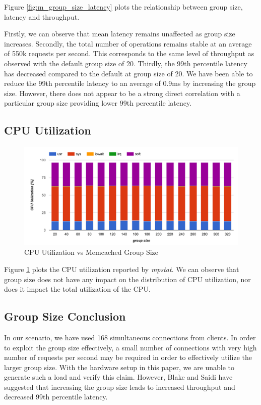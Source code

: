 Figure \ref{fig:m_group_size_latency} plots the relationship between group size, latency and throughput.

Firstly, we can observe that mean latency remains unaffected as group size increases.
Secondly, the total number of operations remains stable at an average of 550k requests per second. This corresponds to the same level of throughput as observed with the default group size of 20.
Thirdly, the 99th percentile latency has decreased compared to the default at group size of 20. We have been able to reduce the 99th percentile latency to an average of 0.9ms by increasing the group size. However, there does not appear to be a strong direct correlation with a particular group size providing lower 99th percentile latency.

\subsection{CPU Utilization}

\begin{figure}[h]
    \includegraphics[width=\textwidth]{./res2/m_group_size_cpu.png}
    \caption{CPU Utilization vs Memcached Group Size}
    \label{fig:m_group_size_cpu}
\end{figure}

Figure \ref{fig:m_group_size_cpu} plots the CPU utilization reported by \textit{mpstat}. We can observe that group size does not have any impact on the distribution of CPU utilization, nor does it impact the total utilization of the CPU.

\subsection{Group Size Conclusion}

In our scenario, we have used 168 simultaneous connections from clients. In order to exploit the group size effectively, a small number of connections with very high number of requests per second may be required in order to effectively utilize the larger group size. With the hardware setup in this paper, we are unable to generate such a load and verify this claim. However, Blake and Saidi \cite{blake54does} have suggested that increasing the group size leads to increased throughput and decreased 99th percentile latency.


